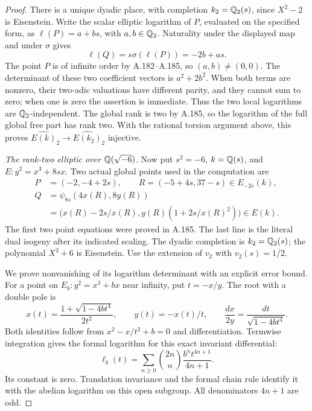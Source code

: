 \begin{proof}
There is a unique dyadic place, with completion
\(k_2=\mathbb Q_2(s)\), since \(X^2-2\) is
Eisenstein.  Write the scalar elliptic logarithm
of \(P\), evaluated on the specified form, as
\(\ell(P)=a+bs\), with \(a,b\in\mathbb Q_2\).
Naturality under the displayed map and under
\(\sigma\) gives
\[
                  \ell(Q)=s\sigma(\ell(P))=-2b+as.
\tag{A.190.4}
\]
The point \(P\) is of infinite order by A.182--A.185,
so \((a,b)\ne(0,0)\).  The determinant of these
two coefficient vectors is \(a^2+2b^2\).
When both terms are nonzero, their two-adic
valuations have different parity, and they cannot
sum to zero; when one is zero the assertion is
immediate.  Thus the two local logarithms are
\(\mathbb Q_2\)-independent.  The global rank is two
by A.185, so the logarithm of the full global
free part has rank two.  With the rational torsion
argument above, this proves
\(\widehat{E(k)}_2\to\widehat{E(k_2)}_2\)
injective.

\emph{The rank-two elliptic over \(\mathbb Q(\sqrt{-6})\).}
Now put \(s^2=-6\), \(k=\mathbb Q(s)\), and
\(E:y^2=x^3+8sx\).  Two actual global points
used in the computation are
\[
\begin{aligned}
 P&=(-2,-4+2s),\qquad R=(-5+4s,37-s)\in E_{-2s}(k),\\
 Q&=\psi_{8s}(4x(R),8y(R))\\
  &=\bigl(x(R)-2s/x(R),
              y(R)(1+2s/x(R)^2)\bigr)\in E(k).
\end{aligned}
\tag{A.190.5}
\]
The first two point equations were proved in
A.185.  The last line is the literal dual
isogeny after its indicated scaling.  The dyadic
completion is \(k_2=\mathbb Q_2(s)\); the polynomial
\(X^2+6\) is Eisenstein.  Use the extension
of \(v_2\) with \(v_2(s)=1/2\).

We prove nonvanishing of its logarithm determinant
with an explicit error bound.  For a point on
\(E_b:y^2=x^3+bx\) near infinity, put
\(t=-x/y\).  The root with a double pole is
\[
 x(t)=\frac{1+\sqrt{1-4bt^4}}{2t^2},
 \qquad y(t)=-x(t)/t,
 \qquad \frac{dx}{2y}=\frac{dt}{\sqrt{1-4bt^4}}.
\tag{A.190.6}
\]
Both identities follow from
\(x^2-x/t^2+b=0\) and differentiation.
Termwise integration gives the formal logarithm
for this exact invariant differential:
\[
 \ell_b(t)=\sum_{n\geq0}
           \binom{2n}{n}\frac{b^nt^{4n+1}}{4n+1}.
\tag{A.190.7}
\]
Its constant is zero.  Translation invariance
and the formal chain rule identify it with
the abelian logarithm on this open subgroup.
All denominators \(4n+1\) are odd.


\end{proof}
